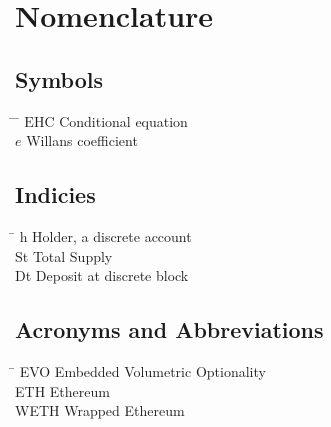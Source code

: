  \cleardoublepage


 \setcounter{tocdepth}{2}
 \tableofcontents

 \cleardoublepage



\chapter*{Nomenclature}\label{chap:symbole}

\section*{Symbols}
\begin{tabbing}
 \hspace*{1.6cm} \= \hspace*{8cm} \= \kill
$\mathrm{EHC}$ \> Conditional equation \> [$-$] \\[0.5ex]
$e$ \> Willans coefficient \> [$-$] \\
\end{tabbing}


\section*{Indicies}
\begin{tabbing}
 \hspace*{1.6cm}  \= \kill
 h \> Holder, a discrete account \\[0.5ex]
  St \> Total Supply \\[0.5ex]
  Dt \> Deposit at discrete block
\end{tabbing}

\section*{Acronyms and Abbreviations}
\begin{tabbing}
 \hspace*{1.6cm}  \= \kill
 EVO \> Embedded Volumetric Optionality \\[0.5ex]
 ETH \> Ethereum \\[0.5ex]
 WETH \> Wrapped Ethereum
\end{tabbing}

 \cleardoublepage

